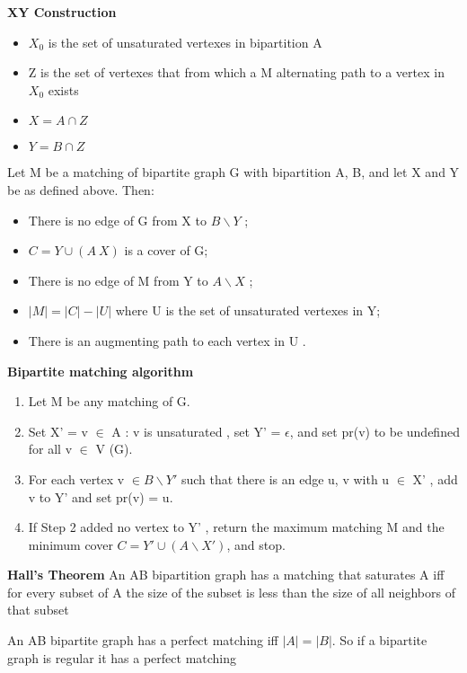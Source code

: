 \documentclass[12pt]{article}
\begin{document}
\textbf{XY Construction}
\begin{itemize}
    \item $X_0$ is the set of unsaturated vertexes in bipartition A
    \item Z is the set of vertexes that from which a M alternating path to a vertex in $X_0$ exists
    \item $X=A\cap Z$
    \item $Y =B\cap Z$
\end{itemize}

 Let M be a matching of bipartite graph G with bipartition A, B, and let X and Y be as defined above. Then:
\begin{itemize}
    \item There is no edge of G from X to  $B \backslash Y$ ;
    \item $C = Y \cup (A \ X )$ is a cover of G;
    \item There is no edge of M from Y to $A \backslash X$ ;
    \item $|M | = |C|-|U |$ where U is the set of unsaturated vertexes in Y;
    \item There is an augmenting path to each vertex in U .
\end{itemize}

\textbf{Bipartite matching algorithm}
\begin{enumerate}
    \item Let M be any matching of G.
    \item Set X' = {v $\in$ A : v is unsaturated }, set Y' = $\epsilon$, and set pr(v) to be undefined for all v $\in$ V (G).
    \item For each vertex v $\in B \backslash Y'$ such that there is an edge {u, v} with u $\in$ X' , add v to Y' and set pr(v) = u.
    \item If Step 2 added no vertex to Y' , return the maximum matching M and the minimum cover $C = Y' \cup (A \backslash X' )$, and stop.
\end{enumerate}

\textbf{Hall's Theorem} An AB bipartition graph has a matching that saturates A iff for every subset of A the size of the subset is less than the size of all neighbors of that subset

An AB bipartite graph has a perfect matching iff $|A| = |B|$. So if a bipartite graph is regular it has a perfect matching
\end{document}
